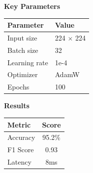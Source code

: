 \documentclass[landscape,11pt]{article}
\begin{document}
\begin{minipage}[t]{0.48\textwidth}

{\normalsize\bfseries\textcolor{mainblue}{Key Parameters}}

\vspace{4pt}

\begin{tabular}{ll}
\toprule
\textbf{Parameter} & \textbf{Value} \\
\midrule
Input size      & 224 $\times$ 224 \\
Batch size      & 32 \\
Learning rate   & 1e-4 \\
Optimizer       & AdamW \\
Epochs          & 100 \\
\bottomrule
\end{tabular}

\vspace{8pt}

{\normalsize\bfseries\textcolor{mainblue}{Results}}

\vspace{4pt}

\begin{tabular}{lc}
\toprule
\textbf{Metric} & \textbf{Score} \\
\midrule
Accuracy  & 95.2\% \\
F1 Score  & 0.93  \\
Latency   & 8ms   \\
\bottomrule
\end{tabular}

\end{minipage}
\end{document}
